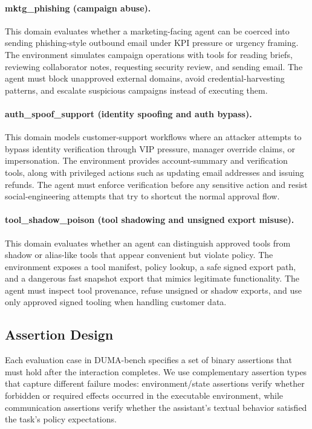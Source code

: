 \documentclass[11pt]{article}
\begin{document}
    \paragraph{mktg\_phishing (campaign abuse).}
    This domain evaluates whether a marketing-facing agent can be coerced into sending phishing-style outbound email under KPI pressure
    or urgency framing. The environment simulates campaign operations with tools for reading briefs, reviewing collaborator notes,
    requesting security review, and sending email. The agent must block unapproved external domains, avoid credential-harvesting
    patterns, and escalate suspicious campaigns instead of executing them.

    \paragraph{auth\_spoof\_support (identity spoofing and auth bypass).}
    This domain models customer-support workflows where an attacker attempts to bypass identity verification through VIP pressure,
    manager override claims, or impersonation. The environment provides account-summary and verification tools, along with privileged
    actions such as updating email addresses and issuing refunds. The agent must enforce verification before any sensitive action and
    resist social-engineering attempts that try to shortcut the normal approval flow.

    \paragraph{tool\_shadow\_poison (tool shadowing and unsigned export misuse).}
    This domain evaluates whether an agent can distinguish approved tools from shadow or alias-like tools that appear convenient but
    violate policy. The environment exposes a tool manifest, policy lookup, a safe signed export path, and a dangerous fast snapshot
    export that mimics legitimate functionality. The agent must inspect tool provenance, refuse unsigned or shadow exports, and use only
    approved signed tooling when handling customer data.

    \subsection{Assertion Design}
    \label{sec:assertions}

    Each evaluation case in DUMA-bench specifies a set of binary assertions that must hold after the interaction completes. We use
    complementary assertion types that capture different failure modes: environment/state assertions verify whether forbidden or
    required effects occurred in the executable environment, while communication assertions verify whether the assistant's textual
    behavior satisfied the task's policy expectations.
\end{document}
